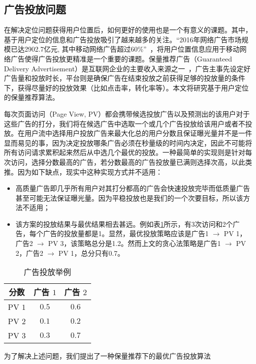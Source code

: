 \subsection{广告投放问题}

在解决定位问题获得用户位置后，如何更好的使用也是一个有意义的课题。其中，基于用户定位的信息和广告投放吸引了越来越多的关注。“2016年网络广告市场规模已达2902.7亿元, 其中移动网络广告超过60\%”~\cite{赵杨2018基于机器学习混合算法的}，将用户位置信息应用于移动网络广告使得广告投放更精准是一个重要的课题。保量推荐广告（Guaranteed Delivery Advertisement）是互联网企业的主要收入来源之一~\cite{korula2016optimizing, mcafee2013maximally}，广告主事先设定好广告量和投放时长，平台则是确保广告在结束投放之前获得足够的投放量的条件下，获得尽量好的投放效果（比如点击率，转化率等）。本文将研究基于用户定位的保量推荐算法。

每次页面访问（Page  View, PV）都会携带候选投放广告以及预测出的该用户对于这些广告的打分，我们将在候选广告中选取一个或几个广告投放给该用户或者不投放。在用户流中选择用户投放广告来最大化总的用户分数且保证曝光量并不是一件显而易见的事，因为决定投放哪条广告必须在秒量级的时间内决定，因此不可能将所有访问请求累积起来然后从中选几个最优的投放。一种最简单的实现则是针对每次访问，选择分数最高的广告，若分数最高的广告投放量已满则选择次高，以此类推。因为如下缺点，现实中这种实现方式并不适用：
\begin{itemize}
	\item 高质量广告即几乎所有用户对其打分都高的广告会快速投放完毕而低质量广告甚至可能无法保证曝光量。因为平稳投放也是我们的一个次要目标，所以该方法不适用；
	\item 该方案的投放结果与最优结果相去甚远。例如表\ref{tab:eoa}所示，有3次访问和2个广告，每个广告的投放量都是1。显然，最优投放策略应该是广告1 $\rightarrow$ PV 1，广告2 $\rightarrow$ PV 3，该策略总分是1.2。然而上文的贪心法策略是广告1 $\rightarrow$ PV 2，广告2 $\rightarrow$ PV 1，总分只有0.7。
\end{itemize}
\begin{table}[htb]
	\centering
	\caption{广告投放举例}
	\label{tab:eoa}
	\begin{tabular}{ccc}
		\toprule
		分数 & 广告 $1$ & 广告 $2$ \\
		\midrule
		PV $1$ & $0.5$ & $0.6$ \\
		\midrule
		PV $2$ & $0.1$ & $0.2$ \\
		\midrule
		PV $3$ & $0.3$ & $0.7$ \\
		\bottomrule
	\end{tabular}
\end{table}
为了解决上述问题，我们提出了一种保量推荐下的最优广告投放算法

